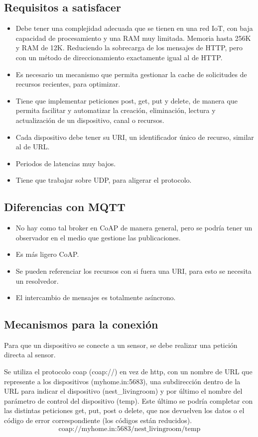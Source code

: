 \documentclass[12pt]{report} %
\begin{document}
\subsection{Requisitos a satisfacer}
	\begin{itemize}
		\item Debe tener una complejidad adecuada que se tienen en una red IoT, con baja capacidad de procesamiento y una RAM muy limitada. Memoria hasta 256K y RAM de 12K. Reduciendo la sobrecarga de los mensajes de HTTP, pero con un método de direccionamiento exactamente igual al de HTTP.
		\item Es necesario un mecanismo que permita gestionar la cache de solicitudes de recursos recientes, para optimizar.
		\item Tiene que implementar peticiones post, get, put y delete, de manera que permita facilitar y automatizar la creación, eliminación, lectura y actualización de un dispositivo, canal o recursos.
		\item Cada dispositivo debe tener su URI, un identificador único de recurso, similar al de URL.
		\item Periodos de latencias muy bajos.
		\item Tiene que trabajar sobre UDP, para aligerar el protocolo.
	\end{itemize}

\subsection{Diferencias con MQTT}
\begin{itemize}
	\item No hay como tal broker en CoAP de manera general, pero se podría tener un observador en el medio que gestione las publicaciones.
	\item Es más ligero CoAP.
	\item Se pueden referenciar los recursos con si fuera una URI, para esto se necesita un resolvedor.
	\item El intercambio de mensajes es totalmente asíncrono.
\end{itemize}

\subsection{Mecanismos para la conexión}
Para que un dispositivo se conecte a un sensor, se debe realizar una petición directa al sensor.

Se utiliza el protocolo coap (coap://) en vez de http, con un nombre de URL que represente a los dispositivos (myhome.in:5683), una subdirección dentro de la URL para indicar el dispositivo (nest\_livingroom) y por último el nombre del parámetro de control del dispositivo (temp). Este último se podría completar con las distintas peticiones get, put, post o delete, que nos devuelven los datos o el código de error correspondiente (los códigos están reducidos). $$\text{coap://myhome.in:5683/nest\_livingroom/temp}$$
\end{document}
